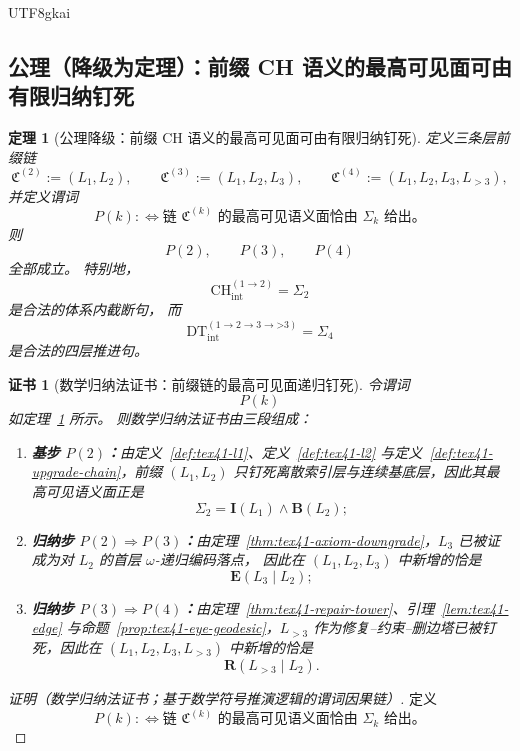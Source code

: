 \documentclass[12pt]{article}
\newtheorem{theorem}{定理}[section]
\newtheorem{Certificate}{证书}[section]
\newcommand{\CHint}{\mathrm{CH}_{\mathrm{int}}}
\newcommand{\DTint}{\mathrm{DT}_{\mathrm{int}}}
\begin{document}
\begin{CJK*}{UTF8}{gkai}
\subsection{公理（降级为定理）：前缀 CH 语义的最高可见面可由有限归纳钉死}
\label{subsec:tex41-ch-confirmation-axiom}

\begin{theorem}[公理降级：前缀 CH 语义的最高可见面可由有限归纳钉死]
\label{thm:tex41-ch-confirmation-induction}
定义三条层前缀链
\[
  \mathfrak C^{(2)}:=(L_1,L_2),\qquad
  \mathfrak C^{(3)}:=(L_1,L_2,L_3),\qquad
  \mathfrak C^{(4)}:=(L_1,L_2,L_3,L_{>3}),
\]
并定义谓词
\[
  P(k)
  :
  \Longleftrightarrow
  \text{链 }\mathfrak C^{(k)}\text{ 的最高可见语义面恰由 }\Sigma_k\text{ 给出。}
\]
则
\[
  P(2),\qquad P(3),\qquad P(4)
\]
全部成立。
特别地，
\[
  \CHint^{(1\to2)}=\Sigma_2
\]
是合法的体系内截断句，
而
\[
  \DTint^{(1\to2\to3\to\text{>3})}=\Sigma_4
\]
是合法的四层推进句。
\end{theorem}

\begin{Certificate}[数学归纳法证书：前缀链的最高可见面递归钉死]
\label{cert:tex41-ch-confirmation-induction}
令谓词
\[
  P(k)
\]
如定理~\ref{thm:tex41-ch-confirmation-induction} 所示。
则数学归纳法证书由三段组成：
\begin{enumerate}
  \item \textbf{基步 $P(2)$：}由定义~\ref{def:tex41-l1}、定义~\ref{def:tex41-l2} 与定义~\ref{def:tex41-upgrade-chain}，前缀 $(L_1,L_2)$
    只钉死离散索引层与连续基底层，因此其最高可见语义面正是
  \[
    \Sigma_2=\mathbf I(L_1)\wedge \mathbf B(L_2);
  \]
  \item \textbf{归纳步 $P(2)\Rightarrow P(3)$：}由定理~\ref{thm:tex41-axiom-downgrade}，$L_3$ 已被证成为对 $L_2$ 的首层 $\omega$-递归编码落点，
    因此在 $(L_1,L_2,L_3)$ 中新增的恰是
  \[
    \mathbf E(L_3\mid L_2);
  \]
  \item \textbf{归纳步 $P(3)\Rightarrow P(4)$：}由定理~\ref{thm:tex41-repair-tower}、引理~\ref{lem:tex41-edge} 与命题~\ref{prop:tex41-eye-geodesic}，$L_{>3}$ 作为修复--约束--删边塔已被钉死，因此在 $(L_1,L_2,L_3,L_{>3})$ 中新增的恰是
  \[
    \mathbf R(L_{>3}\mid L_2).
  \]
\end{enumerate}
\end{Certificate}

\begin{proof}[证明（数学归纳法证书；基于数学符号推演逻辑的谓词因果链）]
定义
\[
  P(k)
  :
  \Longleftrightarrow
  \text{链 }\mathfrak C^{(k)}\text{ 的最高可见语义面恰由 }\Sigma_k\text{ 给出。}
\]


\end{proof}
\end{CJK*}
\end{document}
